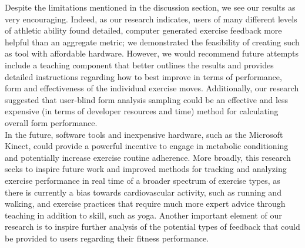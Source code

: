 Despite the limitations mentioned in the discussion section, we see our results as very encouraging. Indeed, as our research indicates, users of many different levels of athletic ability found detailed, computer generated exercise feedback more helpful than an aggregate metric; we demonstrated the feasibility of creating such as tool with affordable hardware.  However, we would recommend future attempts include a teaching component that better outlines the results and provides detailed instructions regarding how to best improve in terms of performance, form and effectiveness of the individual exercise moves.  Additionally, our research suggested that user-blind form analysis sampling could be an effective and less expensive (in terms of developer resources and time)  method for calculating overall form performance.\\
In the future, software tools and inexpensive hardware, such as the Microsoft Kinect, could provide a powerful incentive to engage in  metabolic conditioning and potentially increase exercise routine adherence.  More broadly, this research seeks to inspire future work and improved methods for tracking and analyzing exercise performance in real time of a broader spectrum of exercise types, as there is currently a bias towards cardiovascular activity, such as running and walking, and exercise practices that require much more expert advice through teaching in addition to skill, such as yoga.  Another important element of our research is to inspire further analysis of the potential types of feedback that could be provided to users regarding their fitness performance.



